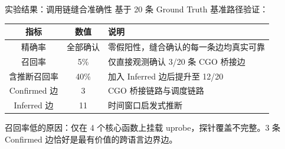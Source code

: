 \documentclass[aspectratio=169, 10pt]{beamer}
\begin{document}
\begin{frame}{实验结果：调用链缝合准确性}
    基于 20 条 Ground Truth 基准路径验证：

    \begin{table}[]
        \small
        \centering
        \begin{tabular}{|c|c|p{6cm}|}
            \hline
            \textbf{指标} & \textbf{数值} & \textbf{说明} \\ \hline
            精确率 & 全部确认 & 零假阳性，缝合确认的每一条边均真实可靠 \\ \hline
            召回率 & 5\% & 仅直接观测确认 3/20 条 CGO 桥接边 \\ \hline
            含推断召回率 & 40\% & 加入 Inferred 边后提升至 12/20 \\ \hline
            Confirmed 边 & 3 & CGO 桥接链路与调度链路 \\ \hline
            Inferred 边 & 11 & 时间窗口启发式推断 \\ \hline
        \end{tabular}
    \end{table}

    \vspace{0.5em}
    召回率低的原因：仅在 4 个核心函数上挂载 uprobe，探针覆盖不完整。3 条 Confirmed 边恰好是最有价值的跨语言边界边。
\end{frame}
\end{document}
